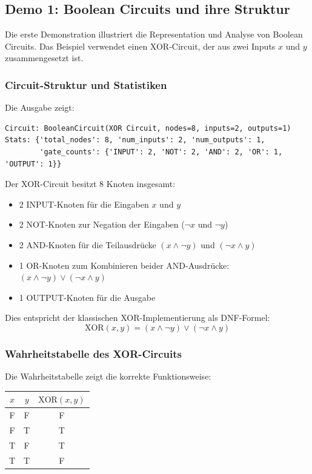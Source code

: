 ﻿\documentclass[a4paper,12pt]{article}
\theoremstyle{definition}
\begin{document}
\subsection{Demo 1: Boolean Circuits und ihre Struktur}

Die erste Demonstration illustriert die Representation und Analyse von Boolean Circuits. Das Beispiel verwendet einen XOR-Circuit, der aus zwei Inputs $x$ und $y$ zusammengesetzt ist.

\subsubsection{Circuit-Struktur und Statistiken}

Die Ausgabe zeigt:
\begin{lstlisting}
Circuit: BooleanCircuit(XOR Circuit, nodes=8, inputs=2, outputs=1)
Stats: {'total_nodes': 8, 'num_inputs': 2, 'num_outputs': 1, 
        'gate_counts': {'INPUT': 2, 'NOT': 2, 'AND': 2, 'OR': 1, 'OUTPUT': 1}}
\end{lstlisting}

Der XOR-Circuit besitzt 8 Knoten insgesamt:
\begin{itemize}
    \item 2 INPUT-Knoten für die Eingaben $x$ und $y$
    \item 2 NOT-Knoten zur Negation der Eingaben ($\neg x$ und $\neg y$)
    \item 2 AND-Knoten für die Teilausdrücke $(x \land \neg y)$ und $(\neg x \land y)$
    \item 1 OR-Knoten zum Kombinieren beider AND-Ausdrücke: $(x \land \neg y) \lor (\neg x \land y)$
    \item 1 OUTPUT-Knoten für die Ausgabe
\end{itemize}

Dies entspricht der klassischen XOR-Implementierung als DNF-Formel:
\[
\text{XOR}(x, y) = (x \land \neg y) \lor (\neg x \land y)
\]

\subsubsection{Wahrheitstabelle des XOR-Circuits}

Die Wahrheitstabelle zeigt die korrekte Funktionsweise:
\begin{center}
\begin{tabular}{cc|c}
$x$ & $y$ & $\text{XOR}(x, y)$ \\
\hline
F & F & F \\
F & T & T \\
T & F & T \\
T & T & F
\end{tabular}
\end{center}
\end{document}
